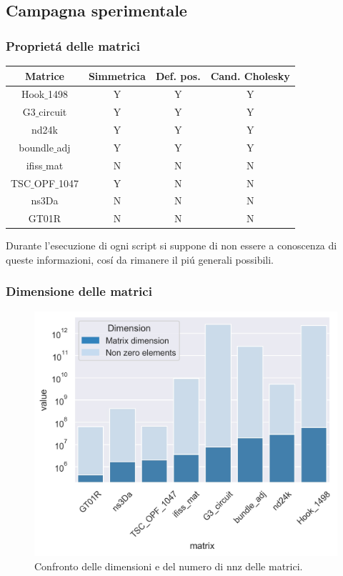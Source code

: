 \documentclass{beamer}
\begin{document}
\subsection{Campagna sperimentale}

\begin{frame}
\frametitle{Propriet\'a delle matrici}
\begin{table}
\begin{tabular}{c c c c}
\toprule
\textbf{Matrice} & \textbf{Simmetrica} & \textbf{Def. pos.} & \textbf{Cand. Cholesky}\\
\midrule
Hook$\_$1498 & Y & Y & Y\\
 G3$\_$circuit & Y & Y & Y\\
 nd24k & Y & Y & Y\\
 boundle$\_$adj & Y & Y & Y\\
 ifiss$\_$mat & N & N & N\\
 TSC$\_$OPF$\_$1047 & Y & N & N\\
 ns3Da & N & N & N\\
 GT01R & N & N & N \\
\bottomrule
\end{tabular}
\end{table}
Durante l'esecuzione di ogni script si suppone di non essere a conoscenza di queste informazioni, cos\'i da rimanere il pi\'u generali possibili.
\end{frame}

\begin{frame}
	\frametitle{Dimensione delle matrici}
	\begin{figure}
		\includegraphics[width=0.8\textheight]{assets/dimension2.jpg}
		\caption{Confronto delle dimensioni e del numero di nnz delle matrici.}
		\label{fig:dim}
	\end{figure}
\end{frame}
\end{document}
